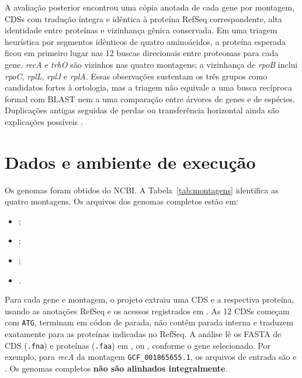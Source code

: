 \documentclass[12pt]{article}
\begin{document}
A avaliação posterior encontrou uma cópia anotada de cada gene por montagem,
CDSs com tradução íntegra e idêntica à proteína RefSeq correspondente, alta
identidade entre proteínas e vizinhança gênica conservada. Em uma triagem
heurística por segmentos idênticos de quatro aminoácidos, a proteína esperada
ficou em primeiro lugar nas 12 buscas direcionais entre proteomas para cada
gene. \textit{recA} e \textit{trhO} são vizinhos nas quatro montagens; a
vizinhança de \textit{rpoB} inclui \textit{rpoC}, \textit{rplL}, \textit{rplJ}
e \textit{rplA}. Essas observações sustentam os três grupos como candidatos
fortes à ortologia, mas a triagem não equivale a uma busca recíproca formal
com BLAST nem a uma comparação entre árvores de genes e de espécies. Duplicações
antigas seguidas de perdas ou transferência horizontal ainda são explicações
possíveis \cite{tatusov1997,ncbiorthology}.

\section{Dados e ambiente de execução}

Os genomas foram obtidos do NCBI. A Tabela~\ref{tab:montagens} identifica as
quatro montagens. Os arquivos dos genomas completos estão em:
\begin{itemize}
\item {};
\item {};
\item {};
\item {}.
\end{itemize}
Para cada gene e montagem, o projeto extraiu uma CDS e a respectiva proteína,
usando as anotações RefSeq e os acessos registrados em
. As 12 CDSs começam com \texttt{ATG}, terminam
em códon de parada, não contêm parada interna e traduzem exatamente para as
proteínas indicadas no RefSeq. A análise lê os FASTA de CDS (\texttt{.fna}) e
proteínas (\texttt{.faa}) em , 
ou , conforme o gene selecionado. Por exemplo, para
\textit{recA} da montagem \texttt{GCF\_001865655.1}, os arquivos de entrada
são  e
. Os genomas completos
\textbf{não são alinhados integralmente}.
\end{document}
